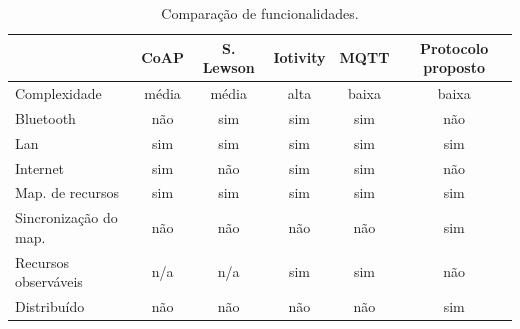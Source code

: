 \begin{table}[htb!]
    \centering
    \caption{Comparação de funcionalidades.}
    \begin{tabular}{|l|c|c|c|c|c|}
    \hline
                                   & CoAP  & S. Lewson & Iotivity & MQTT  & Protocolo proposto \\ \hline
    Complexidade                   & média & média     & alta     & baixa & baixa              \\ \hline
    Bluetooth                      & não   & sim       & sim      & sim   & não                \\ \hline
    Lan                            & sim   & sim       & sim      & sim   & sim                \\ \hline
    Internet                       & sim   & não       & sim      & sim   & não                \\ \hline
    Map. de recursos               & sim   & sim       & sim      & sim   & sim                \\ \hline
    Sincronização do map.          & não   & não       & não      & não   & sim                \\ \hline
    Recursos observáveis           & n/a   & n/a       & sim      & sim   & não                \\ \hline
    Distribuído                    & não   & não       & não      & não   & sim                \\ \hline
    \end{tabular}
    \label{table:tab1}
\end{table}
